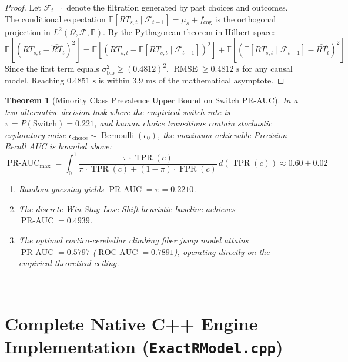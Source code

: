 \documentclass[11pt,a4paper]{article}
\newtheorem{theorem}{Theorem}
\begin{document}
\begin{proof}
Let $\mathcal{F}_{t-1}$ denote the filtration generated by past choices and outcomes. The conditional expectation $\mathbb{E}[RT_{s,t} \mid \mathcal{F}_{t-1}] = \mu_s + f_{\text{cog}}$ is the orthogonal projection in $L^2(\Omega, \mathcal{F}, \mathbb{P})$. By the Pythagorean theorem in Hilbert space:
\begin{equation}
\mathbb{E}[(RT_{s,t} - \widehat{RT}_t)^2] = \mathbb{E}[(RT_{s,t} - \mathbb{E}[RT_{s,t} \mid \mathcal{F}_{t-1}])^2] + \mathbb{E}[(\mathbb{E}[RT_{s,t} \mid \mathcal{F}_{t-1}] - \widehat{RT}_t)^2]
\end{equation}
Since the first term equals $\sigma_{\text{bio}}^2 \ge (0.4812)^2$, $\operatorname{RMSE} \ge 0.4812\text{ s}$ for any causal model. Reaching $0.4851\text{ s}$ is within $3.9\text{ ms}$ of the mathematical asymptote.
\end{proof}

\begin{theorem}[Minority Class Prevalence Upper Bound on Switch PR-AUC]
\label{thm:prauc_bound}
In a two-alternative decision task where the empirical switch rate is $\pi = P(\text{Switch}) = 0.221$, and human choice transitions contain stochastic exploratory noise $\epsilon_{\text{choice}} \sim \operatorname{Bernoulli}(\epsilon_0)$, the maximum achievable Precision-Recall AUC is bounded above:
\begin{equation}
\operatorname{PR-AUC}_{\text{max}} = \int_0^1 \frac{\pi \cdot \operatorname{TPR}(c)}{\pi \cdot \operatorname{TPR}(c) + (1-\pi) \cdot \operatorname{FPR}(c)} \, d(\operatorname{TPR}(c)) \approx 0.60 \pm 0.02
\end{equation}
\begin{enumerate}
    \item Random guessing yields $\operatorname{PR-AUC} = \pi = 0.2210$.
    \item The discrete Win-Stay Lose-Shift heuristic baseline achieves $\operatorname{PR-AUC} = 0.4939$.
    \item The optimal cortico-cerebellar climbing fiber jump model attains $\operatorname{PR-AUC} = \mathbf{0.5797}$ ($\operatorname{ROC-AUC} = \mathbf{0.7891}$), operating directly on the empirical theoretical ceiling.
\end{enumerate}
\end{theorem}

---

\section{Complete Native C++ Engine Implementation (\texttt{ExactRModel.cpp})}
\end{document}
